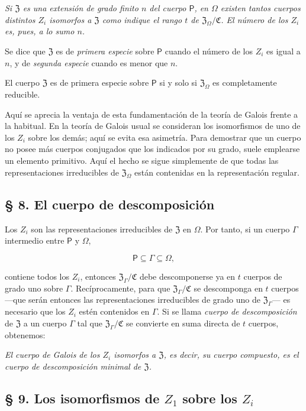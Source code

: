 \emph{Si $\mathfrak Z$ es una extensión de grado finito $n$ del cuerpo $\mathsf P$, en $\Omega$ existen tantos cuerpos distintos $Z_i$ isomorfos a $\mathfrak Z$ como indique el rango $t$ de $\mathfrak Z_\Omega/\mathfrak C$. El número de los $Z_i$ es, pues, a lo sumo $n$.}

Se dice que $\mathfrak Z$ es de \emph{primera especie} sobre $\mathsf P$ cuando el número de los $Z_i$ es igual a $n$, y de \emph{segunda especie} cuando es menor que $n$.

El cuerpo $\mathfrak Z$ es de primera especie sobre $\mathsf P$ si y solo si $\mathfrak Z_\Omega$ es completamente reducible.

Aquí se aprecia la ventaja de esta fundamentación de la teoría de Galois frente a la habitual. En la teoría de Galois usual se consideran los isomorfismos de uno de los $Z_i$ sobre los demás; aquí se evita esa asimetría. Para demostrar que un cuerpo no posee más cuerpos conjugados que los indicados por su grado, suele emplearse un elemento primitivo. Aquí el hecho se sigue simplemente de que todas las representaciones irreducibles de $\mathfrak Z_\Omega$ están contenidas en la representación regular.

\subsection*{§ 8. El cuerpo de descomposición}

Los $Z_i$ son las representaciones irreducibles de $\mathfrak Z$ en $\Omega$. Por tanto, si un cuerpo $\Gamma$ intermedio entre $\mathsf P$ y $\Omega$,

\[
\mathsf P\subseteq\Gamma\subseteq\Omega,
\]

contiene todos los $Z_i$, entonces $\mathfrak Z_\Gamma/\mathfrak C$ debe descomponerse ya en $t$ cuerpos de grado uno sobre $\Gamma$. Recíprocamente, para que $\mathfrak Z_\Gamma/\mathfrak C$ se descomponga en $t$ cuerpos ---que serán entonces las representaciones irreducibles de grado uno de $\mathfrak Z_\Gamma$--- es necesario que los $Z_i$ estén contenidos en $\Gamma$. Si se llama \emph{cuerpo de descomposición} de $\mathfrak Z$ a un cuerpo $\Gamma$ tal que $\mathfrak Z_\Gamma/\mathfrak C$ se convierte en suma directa de $t$ cuerpos, obtenemos:

\emph{El cuerpo de Galois de los $Z_i$ isomorfos a $\mathfrak Z$, es decir, su cuerpo compuesto, es el cuerpo de descomposición minimal de $\mathfrak Z$.}

\subsection*{§ 9. Los isomorfismos de $Z_1$ sobre los $Z_i$}

